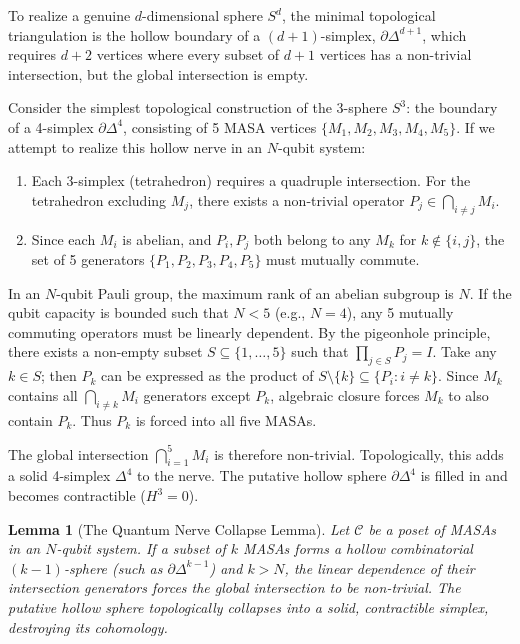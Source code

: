 \documentclass[11pt]{article}
\newtheorem{lemma}[theorem]{Lemma}
\begin{document}
To realize a genuine $d$-dimensional sphere $S^d$, the minimal topological triangulation is the hollow boundary of a $(d+1)$-simplex, $\partial \Delta^{d+1}$, which requires $d+2$ vertices where every subset of $d+1$ vertices has a non-trivial intersection, but the global intersection is empty. 

Consider the simplest topological construction of the 3-sphere $S^3$: the boundary of a 4-simplex $\partial\Delta^4$, consisting of 5 MASA vertices $\{M_1, M_2, M_3, M_4, M_5\}$. If we attempt to realize this hollow nerve in an $N$-qubit system:
\begin{enumerate}
    \item Each 3-simplex (tetrahedron) requires a quadruple intersection. For the tetrahedron excluding $M_j$, there exists a non-trivial operator $P_j \in \bigcap_{i \neq j} M_i$.
    \item Since each $M_i$ is abelian, and $P_i, P_j$ both belong to any $M_k$ for $k \notin \{i,j\}$, the set of 5 generators $\{P_1, P_2, P_3, P_4, P_5\}$ must mutually commute.
\end{enumerate}

In an $N$-qubit Pauli group, the maximum rank of an abelian subgroup is $N$. If the qubit capacity is bounded such that $N < 5$ (e.g., $N=4$), any 5 mutually commuting operators must be linearly dependent. By the pigeonhole principle, there exists a non-empty subset $S \subseteq \{1,\dots,5\}$ such that $\prod_{j \in S} P_j = I$. Take any $k \in S$; then $P_k$ can be expressed as the product of $S \setminus \{k\} \subseteq \{P_i : i \neq k\}$. Since $M_k$ contains all $\bigcap_{i \neq k} M_i$ generators except $P_k$, algebraic closure forces $M_k$ to also contain $P_k$. Thus $P_k$ is forced into all five MASAs.

The global intersection $\bigcap_{i=1}^5 M_i$ is therefore non-trivial. Topologically, this adds a solid 4-simplex $\Delta^4$ to the nerve. The putative hollow sphere $\partial\Delta^4$ is filled in and becomes contractible ($H^3 = 0$). 

\begin{lemma}[The Quantum Nerve Collapse Lemma]
\label{lem:nerve-collapse}
Let $\mathcal{C}$ be a poset of MASAs in an $N$-qubit system. If a subset of $k$ MASAs forms a hollow combinatorial $(k-1)$-sphere (such as $\partial\Delta^{k-1}$) and $k > N$, the linear dependence of their intersection generators forces the global intersection to be non-trivial. The putative hollow sphere topologically collapses into a solid, contractible simplex, destroying its cohomology.
\end{lemma}
\end{document}
